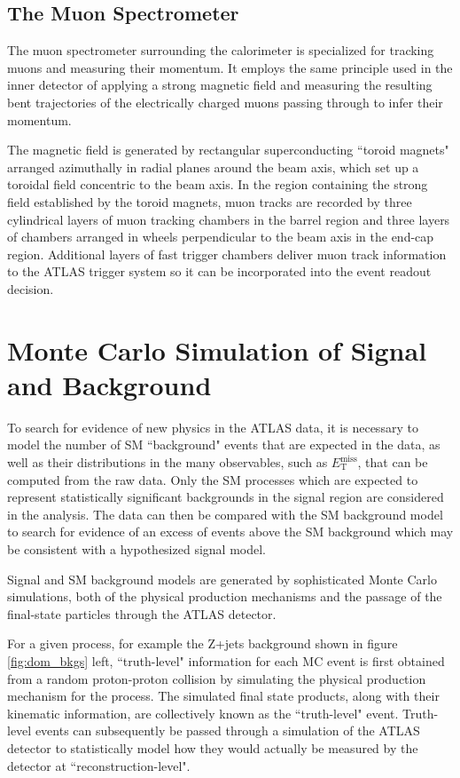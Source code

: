 \documentclass[12pt]{article}
\newcommand*{\met}{\ensuremath{E_\text{T}^\text{miss}}}
\begin{document}
\subsection{The Muon Spectrometer}

The muon spectrometer \cite{atlas} surrounding the calorimeter is specialized for tracking muons and measuring their momentum. It employs the same principle used in the inner detector of applying a strong magnetic field and measuring the resulting bent trajectories of the electrically charged muons passing through to infer their momentum. 

The magnetic field is generated by rectangular superconducting ``toroid magnets" arranged azimuthally in radial planes around the beam axis, which set up a toroidal field concentric to the beam axis. In the region containing the strong field established by the toroid magnets, muon tracks are recorded by three cylindrical layers of muon tracking chambers in the barrel region and three layers of chambers arranged in wheels perpendicular to the beam axis in the end-cap region. Additional layers of fast trigger chambers deliver muon track information to the ATLAS trigger system so it can be incorporated into the event readout decision. 

\newpage

\section{Monte Carlo Simulation of Signal and Background}

To search for evidence of new physics in the ATLAS data, it is necessary to model the number of SM ``background" events that are expected in the data, as well as their distributions in the many observables, such as \met, that can be computed from the raw data. Only the SM processes which are expected to represent statistically significant backgrounds in the signal region are considered in the analysis. The data can then be compared with the SM background model to search for evidence of an excess of events above the SM background which may be consistent with a hypothesized signal model.

Signal and SM background models are generated by sophisticated Monte Carlo simulations, both of the physical production mechanisms and the passage of the final-state particles through the ATLAS detector. 

For a given process, for example the Z+jets background shown in figure \ref{fig:dom_bkgs} left, ``truth-level" information for each MC event is first obtained from a random proton-proton collision by simulating the physical production mechanism for the process. The simulated final state products, along with their kinematic information, are collectively known as the ``truth-level" event. Truth-level events can subsequently be passed through a simulation of the ATLAS detector to statistically model how they would actually be measured by the detector at ``reconstruction-level". 
\end{document}
